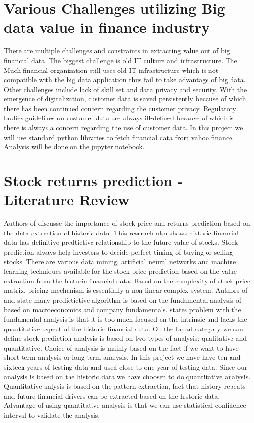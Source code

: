 \section{Various Challenges utilizing Big data value in finance industry }

There are multiple challenges and constraints in extracting value out of big financial data. The biggest challenge is old IT culture and infrastructure.
 The Much financial organization still uses old IT infrastructure which is not compatible with the big data application thus fail to take advantage of big data.
 Other challenges include lack of skill set and data privacy and security. With the emergence of digitalization, customer data is saved persistently because of 
 which there has been continued concern regarding the customer privacy. Regulatory bodies guidelines on customer data are always ill-defined because of which is
 there is always a concern regarding the use of customer data.  In this project we will use standard python libraries to fetch financial data from yahoo finance. 
 Analysis will be done on the jupyter notebook. 
 
\section{Stock returns prediction - Literature Review}

Authors of \cite{Ref8} discusse the importance of stock price and returns prediction based on the data extraction of historic data. This reserach \cite{Ref8}
also shows historic financial data has definitive predtictive relationship to the future value of stocks. Stock prediction always help investors to decide perfect
timing of buying or selling stocks. There are various data mining, artificial neural networks and machine learning techniques available for the stock price prediction based on the value
extraction from the historic financial data. Based on the complexity of stock price matrix, pricing mechanism is essentially a non linear complex system. 
Authors of \cite{Ref9} and \cite{Ref10} state many predictictive algorithm is based on the fundamental analysis of based on macroeconomics and company fundamentals.
\cite{Ref11} states problem with the fundamental analysis is that it is too much focused on the intrinsic and lacks the quantitative aspect of the historic financial
data. On the broad category we can define stock prediction analysis is based on two types of analysis: qualitative and quantitative. Choice of analysis is mainly 
based on the fact if we want to have short term analysis or long term analysis. In this project we have have ten and sixteen years of testing data and used close to 
one year of testing data. Since our analysis is based on the historic data we have choosen to do quantitative analysis. Quantitative anlysis is based on the pattern 
extraction, fact that history repeats and future financial drivers can be extracted based on the historic data. Advantage of using quantitative analysis is that we 
can use statistical confidence interval to validate the analysis. 

